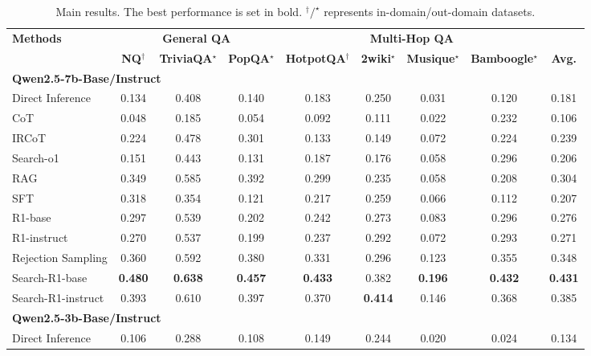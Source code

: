

\begin{table}[t]
    \centering
    \scriptsize
    \setlength{\tabcolsep}{4pt}
    \renewcommand{\arraystretch}{1.2}
    \caption{Main results. The best performance is set in bold. $^\dagger/^\star$ represents in-domain/out-domain datasets.}\label{tab:main}
    \begin{tabular}{lcccccccc}
        \toprule
        \textbf{Methods} & \multicolumn{3}{c}{\textbf{General QA}} & \multicolumn{4}{c}{\textbf{Multi-Hop QA}} \\
        \cmidrule{2-9}
         & \textbf{NQ$^\dagger$} & \textbf{TriviaQA$^\star$} & \textbf{PopQA$^\star$} & \textbf{HotpotQA$^\dagger$} & \textbf{2wiki$^\star$} & \textbf{Musique$^\star$} & \textbf{Bamboogle$^\star$} & \textbf{Avg.} \\
        \midrule
        \multicolumn{8}{l}{\textbf{Qwen2.5-7b-Base/Instruct}} \\
        Direct Inference & 0.134 & 0.408 & 0.140 & 0.183 & 0.250 & 0.031 & 0.120 & 0.181 \\
        CoT & 0.048 & 0.185 & 0.054 & 0.092 & 0.111 & 0.022 & 0.232 & 0.106 \\
        IRCoT & 0.224 & 0.478 & 0.301 & 0.133 & 0.149 & 0.072 & 0.224 & 0.239 \\
        Search-o1 & 0.151 & 0.443 & 0.131 & 0.187 & 0.176 & 0.058 & 0.296 & 0.206 \\
        RAG & 0.349 & 0.585 & 0.392 & 0.299 & 0.235 & 0.058 & 0.208 & 0.304 \\
        SFT & 0.318 & 0.354 & 0.121 & 0.217 & 0.259 & 0.066 & 0.112 & 0.207  \\
        R1-base & 0.297 & 0.539 & 0.202 & 0.242 & 0.273 & 0.083 & 0.296 & 0.276  \\
        R1-instruct & 0.270 & 0.537 & 0.199 & 0.237 & 0.292 & 0.072 & 0.293 & 0.271  \\
        Rejection Sampling & 0.360 & 0.592 & 0.380 & 0.331 & 0.296 & 0.123 & 0.355 & 0.348 \\
        \hdashline
        Search-R1-base & \textbf{0.480} & \textbf{0.638} & \textbf{0.457} & \textbf{0.433} & 0.382 & \textbf{0.196} & \textbf{0.432} & \textbf{0.431}  \\
        Search-R1-instruct & 0.393 & 0.610 & 0.397 & 0.370 & \textbf{0.414} & 0.146 & 0.368 & 0.385 \\
        \midrule
        \multicolumn{8}{l}{\textbf{Qwen2.5-3b-Base/Instruct}} \\
        Direct Inference & 0.106 & 0.288 & 0.108 & 0.149 & 0.244 & 0.020 & 0.024 & 0.134 \\

\end{tabular}
\end{table}
